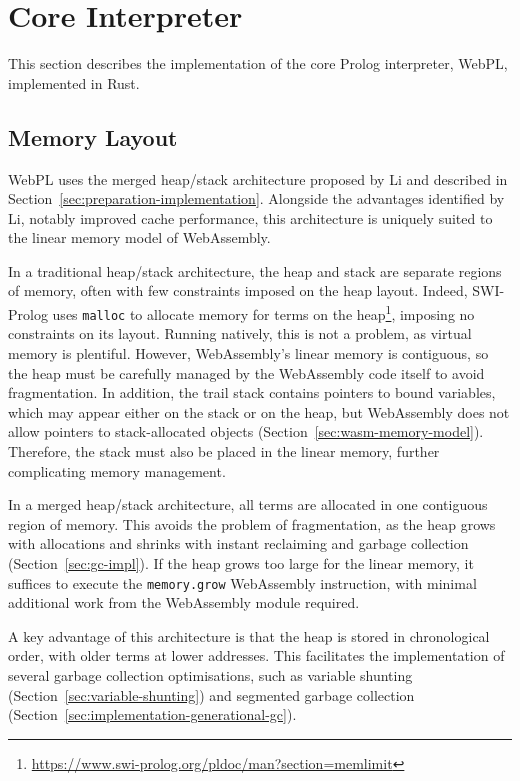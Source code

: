 \section{Core Interpreter}

\label{sec:core-interpreter}

This section describes the implementation of the core Prolog interpreter, WebPL, implemented in Rust.

\subsection{Memory Layout}

\label{sec:memory-layout}

WebPL uses the merged heap/stack architecture proposed by Li \cite{liEfficientMemoryManagement2000} and described in Section~\ref{sec:preparation-implementation}. Alongside the advantages identified by Li, notably improved cache performance, this architecture is uniquely suited to the linear memory model of WebAssembly.

In a traditional heap/stack architecture, the heap and stack are separate regions of memory, often with few constraints imposed on the heap layout. Indeed, SWI-Prolog uses \texttt{malloc} to allocate memory for terms on the heap\footnote{\url{https://www.swi-prolog.org/pldoc/man?section=memlimit}}, imposing no constraints on its layout. Running natively, this is not a problem, as virtual memory is plentiful. However, WebAssembly's linear memory is contiguous, so the heap must be carefully managed by the WebAssembly code itself to avoid fragmentation. In addition, the trail stack contains pointers to bound variables, which may appear either on the stack or on the heap, but WebAssembly does not allow pointers to stack-allocated objects (Section~\ref{sec:wasm-memory-model}). Therefore, the stack must also be placed in the linear memory, further complicating memory management.

In a merged heap/stack architecture, all terms are allocated in one contiguous region of memory. This avoids the problem of fragmentation, as the heap grows with allocations and shrinks with instant reclaiming and garbage collection (Section~\ref{sec:gc-impl}). If the heap grows too large for the linear memory, it suffices to execute the \texttt{memory.grow} WebAssembly instruction, with minimal additional work from the WebAssembly module required.

A key advantage of this architecture is that the heap is stored in chronological order, with older terms at lower addresses. This facilitates the implementation of several garbage collection optimisations, such as variable shunting (Section~\ref{sec:variable-shunting}) and segmented garbage collection (Section~\ref{sec:implementation-generational-gc}).

